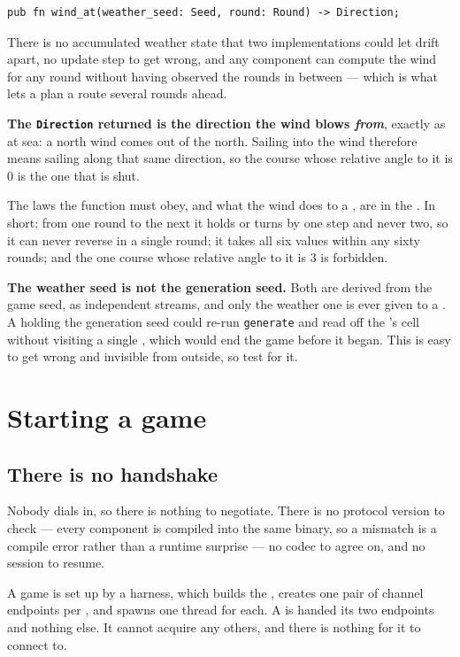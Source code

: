 \documentclass{article}
\begin{document}
\begin{lstlisting}
pub fn wind_at(weather_seed: Seed, round: Round) -> Direction;
\end{lstlisting}

There is no accumulated weather state that two implementations could let drift apart, no update
step to get wrong, and any component can compute the wind for any round without having observed
the rounds in between --- which is what lets a \ship{} plan a route several rounds ahead.

\textbf{The \texttt{Direction} returned is the direction the wind blows \emph{from}}, exactly as
at sea: a north wind comes out of the north. Sailing into the wind therefore means sailing along
that same direction, so the course whose relative angle to it is $0$ is the one that is shut.

The laws the function must obey, and what the wind does to a \ship, are in the \MD. In short: from
one round to the next it holds or turns by one step and never two, so it can never reverse in a
single round; it takes all six values within any sixty rounds; and the one course whose relative
angle to it is $3$ is forbidden.

\textbf{The weather seed is not the generation seed.} Both are derived from the game seed, as
independent streams, and only the weather one is ever given to a \ship. A \ship{} holding the
generation seed could re-run \texttt{generate} and read off the \treasure{}'s cell without visiting
a single \island, which would end the game before it began. This is easy to get wrong and invisible
from outside, so test for it.

\newpage
\section{Starting a game}
\label{proto:connect}

\subsection{There is no handshake}

Nobody dials in, so there is nothing to negotiate. There is no protocol version to check --- every
component is compiled into the same binary, so a mismatch is a compile error rather than a runtime
surprise --- no codec to agree on, and no session to resume.

A game is set up by a harness, which builds the \chart, creates one pair of channel endpoints per
\ship, and spawns one thread for each. A \ship{} is handed its two endpoints and nothing else. It
cannot acquire any others, and there is nothing for it to connect to.
\end{document}
